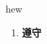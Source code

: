
\begin{frame}
{\huge hew}
\begin{center}
\begin{enumerate}\Large
  \item \textbf{遵守}
\end{enumerate}
\end{center}
\end{frame}
